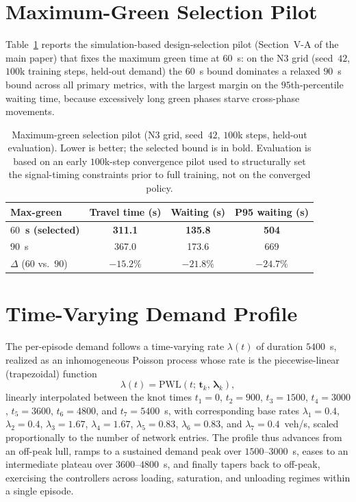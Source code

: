 \section{Maximum-Green Selection Pilot}
\label{app:maxgreen}
Table~\ref{tab:maxgreen_pilot} reports the simulation-based design-selection pilot
(Section~V-A of the main paper) that fixes the maximum green time at $60$~s: on the N3
grid (seed~$42$, $100$k training steps, held-out demand) the $60$~s bound dominates a
relaxed $90$~s bound across all primary metrics, with the largest margin on the
$95$th-percentile waiting time, because excessively long green phases starve cross-phase
movements.

\begin{table}[h]
  \centering
  \caption{Maximum-green selection pilot (N3 grid, seed~$42$, $100$k steps, held-out
  evaluation). Lower is better; the selected bound is in bold. Evaluation is based on an early
  $100$k-step convergence pilot used to structurally set the signal-timing constraints prior
  to full training, not on the converged policy.}
  \label{tab:maxgreen_pilot}
  \begin{tabular}{lccc}
    \toprule
    \textbf{Max-green} & \textbf{Travel time (s)} & \textbf{Waiting (s)} & \textbf{P95 waiting (s)}\\
    \midrule
    \textbf{$60$~s (selected)} & \textbf{311.1} & \textbf{135.8} & \textbf{504}\\
    $90$~s                     & 367.0          & 173.6          & 669\\
    \midrule
    $\Delta$ ($60$ vs.\ $90$)  & $-15.2\%$      & $-21.8\%$      & $-24.7\%$\\
    \bottomrule
  \end{tabular}
\end{table}

\section{Time-Varying Demand Profile}
\label{app:demand}
The per-episode demand follows a time-varying rate $\lambda(t)$ of duration $5400$~s, realized
as an inhomogeneous Poisson process whose rate is the piecewise-linear (trapezoidal) function
\begin{equation}
  \lambda(t) = \mathrm{PWL}\!\left(t;\, \mathbf{t}_k,\, \boldsymbol{\lambda}_k\right),
  \label{eq:demand}
\end{equation}
linearly interpolated between the knot times $t_1=0$, $t_2=900$, $t_3=1500$, $t_4=3000$,
$t_5=3600$, $t_6=4800$, and $t_7=5400$~s, with corresponding base rates $\lambda_1=0.4$,
$\lambda_2=0.4$, $\lambda_3=1.67$, $\lambda_4=1.67$, $\lambda_5=0.83$, $\lambda_6=0.83$, and
$\lambda_7=0.4$~veh/s, scaled proportionally to the number of network entries. The profile thus
advances from an off-peak lull, ramps to a sustained demand peak over $1500$--$3000$~s, eases to
an intermediate plateau over $3600$--$4800$~s, and finally tapers back to off-peak, exercising
the controllers across loading, saturation, and unloading regimes within a single episode.
